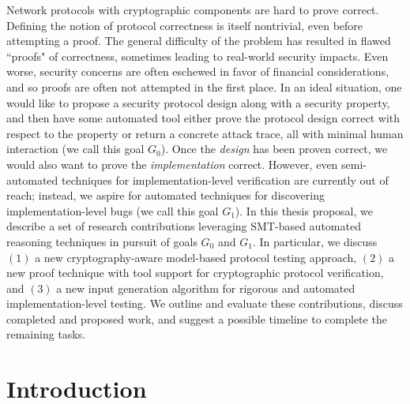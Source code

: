 \documentclass{article}
\theoremstyle{definition}
\begin{document}
Network protocols with cryptographic components are hard to prove correct. 
Defining the notion of protocol correctness is itself nontrivial, 
even before attempting a proof. 
The general difficulty of the problem has resulted in flawed ``proofs" of correctness, 
sometimes leading to real-world security impacts. 
Even worse, security concerns are often eschewed in favor of financial considerations, 
and so proofs are often not attempted in the first place.
In an ideal situation, one would like to propose a security protocol design along with a security property, 
and then have some automated tool either prove the protocol design correct with respect to the property 
or return a concrete attack trace, all with minimal human interaction (we call this goal $G_0$). 
Once the \emph{design} has been proven correct, we would also want to prove the \emph{implementation} correct. 
However, even semi-automated techniques for implementation-level verification are currently 
out of reach; instead, we aspire for automated techniques for discovering implementation-level bugs (we call this goal $G_1$). 
In this thesis proposal, we describe a set of research contributions 
leveraging SMT-based automated reasoning techniques in pursuit 
of goals $G_0$ and $G_1$. 
In particular, we discuss 
$(1)$ a new cryptography-aware model-based protocol testing approach, 
$(2)$ a new proof technique with tool support for cryptographic protocol verification, and 
$(3)$ a new input generation algorithm for rigorous and automated implementation-level testing.
We outline and evaluate these contributions, 
discuss completed and proposed work, 
and suggest a possible timeline to complete the remaining tasks.

\section{Introduction}
\end{document}
